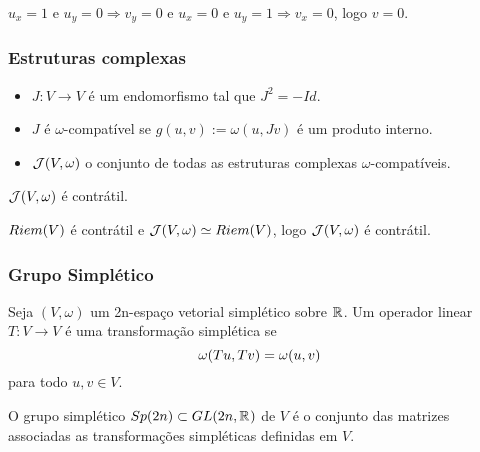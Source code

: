 \documentclass{beamer}
\begin{document}
\begin{footnotesize}
\begin{frame}
\begin{exemplo}
\begin{enumerate}
				$u_{x} = 1$ e $u_{y} = 0 \Rightarrow v_{y} = 0$ e $u_{x} = 0$ e $u_{y} = 1 \Rightarrow v_{x} = 0$, logo $v=0$.
				
			\end{enumerate}			
		\end{exemplo}
	\end{frame}
	
	\begin{frame}
		\frametitle{Estruturas complexas}
		
		\begin{definicao}
			\begin{itemize}
				\item $J: V \to V$ é um endomorfismo tal que $J^{2} = -Id$. 
				
				\item $J$ é $\omega$-compatível se $g(u,v):=\omega(u, Jv)$ é um produto interno. 
				
				\item $\mathcal{J}(V, \omega)$ o conjunto de todas as estruturas complexas $\omega$-compatíveis.
				
			\end{itemize}
		\end{definicao}
	
		\begin{teorema}
				$\mathcal{J}(V, \omega)$ é contrátil.
			\end{teorema}
			\begin{prova}
				$Riem(V)$ é contrátil e $\mathcal{J}(V, \omega) \simeq Riem(V)$, logo $\mathcal{J}(V, \omega) $ é contrátil.
			\end{prova}
	\end{frame}
	
	\begin{frame}
		\frametitle{Grupo Simplético}
		
		\begin{definicao}
			Seja $(V, \omega)$ um 2n-espaço vetorial simplético sobre $\mathbb{R}^{}$. Um operador linear $T: V \to V$ é uma transformação simplética se 
			$$
			\omega(Tu, Tv) = \omega(u, v)
			$$ para todo $u,v\in V$.
		\end{definicao}
		
		\begin{definicao}
			O grupo simplético $Sp(2n) \subset GL(2n, \mathbb{R}^{})$ de $V$ é o conjunto das matrizes associadas as transformações simpléticas definidas em $V$.
		\end{definicao}	
		

\end{frame}
\end{footnotesize}
\end{document}

